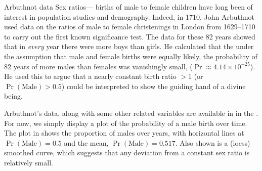 \documentclass[11pt]{book}
\renewenvironment{knitrout}{\small\renewcommand{\baselinestretch}{.85}}{} %
\begin{document}
\begin{Example}[arbuthnot1]{Arbuthnot data}
Sex ratios--- births of male to female children have long been of interest
in population studies and demography. Indeed, in 1710, John Arbuthnot \citep{Arbuthnot:1710}
used data on the ratios of male to female christenings in London from 1629--1710 to carry out the first known significance test.
The data for these 82 years showed that in \emph{every} year there were more boys than girls.
He calculated that the under the assumption
that male and female births were equally likely, the probability of 82 years of
more males than females was vanishingly small,
 ($\Pr \approx 4.14 \times 10^{-25}$).  
He used this to argue that a nearly constant birth ratio $> 1$ (or $\Pr(\mathrm{Male}) > 0.5$)
could be interpreted to show the guiding hand of a divine being.

Arbuthnot's data, along with some other related variables 
are available in  in the .
For now, we simply display a plot of the probability of a male birth over time.
The plot in  shows the proportion of males over years,
with horizontal lines at $\Pr(\mathrm{Male}) = 0.5$ and the mean,
$\Pr(\mathrm{Male}) = 0.517$.  Also shown is a (loess) smoothed curve, which suggests
that any deviation from a constant sex ratio is relatively small.
\begin{knitrout}
\color{fgcolor}\begin{kframe}
\begin{alltt}
 \hlstd{=}\hlstd{)}
   \hlkwb{=} \hlopt{/}\hlopt{+}
   \hlstd{=}\hlstd{,} \hlstd{=}\hlstd{(}\hlstd{,} \hlstd{),} \hlstd{=}\hlstd{)}
  \hlstd{(}\hlstd{=}\hlstd{,} \hlstd{=}\hlstd{,} \hlstd{=}\hlstd{)}
  \hlstd{(}\hlstd{=} \hlstd{=}\hlstd{)}
  \hlstd{(}\hlstd{=}\hlstd{,} \hlstd{=}\hlstd{,} \hlstd{(H[}\hlstd{]}\hlopt{:} \hlstd{),} \hlstd{=}\hlstd{,} \hlstd{=}\hlstd{)}
   \hlkwb{<-} 
  \hlopt{$}\hlopt{$} \hlstd{=}\hlstd{,} \hlstd{=}\hlstd{)}
  \hlstd{\})}
\end{alltt}
\end{kframe}\begin{figure}[!htbp]



\end{figure}
\end{knitrout}
\end{Example}
\end{document}
